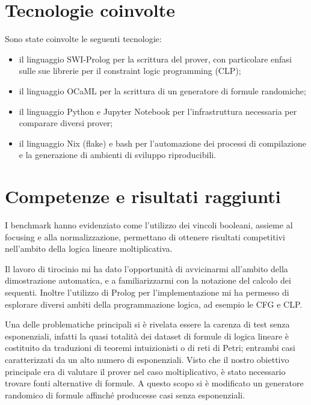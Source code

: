 \documentclass[a4paper, 12pt, italian]{article}
\begin{document}
\section{Tecnologie coinvolte}
Sono state coinvolte le seguenti tecnologie:
\begin{itemize}
	\item il linguaggio SWI-Prolog per la scrittura del prover, con particolare enfasi sulle sue librerie per il constraint logic programming (CLP);
	\item il linguaggio OCaML per la scrittura di un generatore di formule randomiche;
	\item il linguaggio Python e Jupyter Notebook per l'infrastruttura necessaria per comparare diversi prover;
	\item il linguaggio Nix (flake) e bash per l'automazione dei processi di compilazione e la
generazione di ambienti di sviluppo riproducibili.
\end{itemize}

\section{Competenze e risultati raggiunti}
I benchmark hanno evidenziato come l'utilizzo dei vincoli booleani, assieme al focusing e alla normalizzazione, permettano di ottenere risultati competitivi nell’ambito della logica lineare moltiplicativa.

Il lavoro di tirocinio mi ha dato l'opportunità di avvicinarmi all’ambito della dimostrazione automatica, e a familiarizzarmi con la notazione del calcolo dei sequenti.
Inoltre l’utilizzo di Prolog per l'implementazione mi ha permesso di esplorare diversi ambiti della programmazione logica, ad esempio le CFG e CLP.

Una delle problematiche principali si è rivelata essere la carenza di test senza esponenziali, infatti la quasi totalità dei dataset di formule di logica lineare è costituito da traduzioni di teoremi intuizionisti o di reti di Petri; entrambi casi caratterizzati da un alto numero di esponenziali.
Visto che il nostro obiettivo principale era di valutare il prover nel caso moltiplicativo, è stato necessario trovare fonti alternative di formule.
A questo scopo si è modificato un generatore randomico di formule affinché producesse casi senza esponenziali.

\newpage


\end{document}
